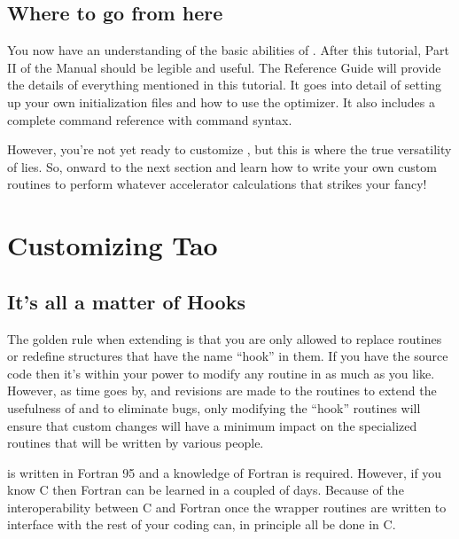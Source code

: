 \section{Where to go from here}
\label{s:where_to_go}

You now have an understanding of the basic abilities of \tao. After
this tutorial, Part II of the \tao Manual should be legible and
useful.  The Reference Guide will provide the details of everything
mentioned in this tutorial.  It goes into detail of setting up your
own initialization files and how to use the optimizer. It also
includes a complete command reference with command syntax.

However, you're not yet ready to customize \tao, but this is where the
true versatility of \tao lies. So, onward to the next section and
learn how to write your own custom routines to perform whatever
accelerator calculations that strikes your fancy!

\chapter{Customizing Tao}
\label{c:custom_tao}

\section{It's all a matter of Hooks}

The golden rule when extending \tao is that you are only allowed to
replace routines or redefine structures that have the name ``hook'' in
them.  If you have the source code then it's within your power to
modify any routine in \tao as much as you like. However, as time goes
by, and revisions are made to the \tao routines to extend the
usefulness of \tao and to eliminate bugs, only modifying the ``hook''
routines will ensure that custom changes will have a minimum impact on
the specialized routines that will be written by various people.

\tao is written in Fortran 95 and a knowledge of Fortran is
required. However, if you know C then Fortran can be learned in a
coupled of days. Because of the interoperability between C and Fortran
once the wrapper routines are written to interface with \tao the rest
of your coding can, in principle all be done in C.

